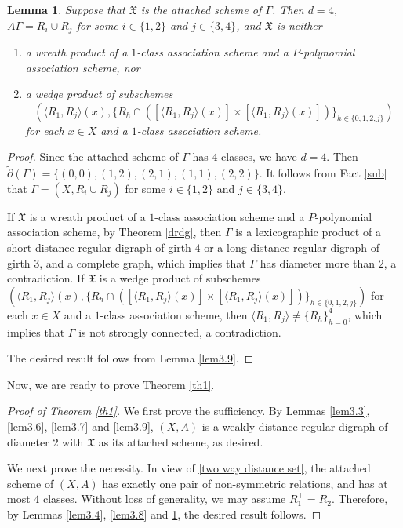 \documentclass[12pt,a4paper]{amsart}
\newtheorem{lemma}[thm]{Lemma}
\theoremstyle{definition}
\begin{document}
\begin{lemma}\label{lem3.10}
Suppose that $\mathfrak{X}$ is the attached scheme of $\Gamma$.	Then $d=4$,  $A\Gamma=R_i\cup R_j$ for some $i\in\{1,2\}$ and $j\in\{3,4\}$, and $\mathfrak{X}$ is neither
\begin{enumerate}
\item\label{lem3.9-1} a wreath product of a $1$-class association scheme and a $P$-polynomial association scheme, nor
	
\item\label{lem3.9-2} a wedge product of subschemes $$(\langle R_1,R_j\rangle(x),\{R_h\cap ([\langle R_1,R_j\rangle(x)]\times [\langle R_1,R_j\rangle(x)])\}_{h\in \{0,1,2,j\}})$$ for each $x\in X$ and a $1$-class association scheme.
\end{enumerate}
\end{lemma}

\begin{proof}
Since the attached scheme of $\Gamma$ has $4$ classes, we have $d=4$. Then $\tilde{\partial}(\Gamma)= \{(0,0),(1,2),(2,1),(1,1),(2,2)\}$. It follows from Fact \ref{sub} that $\Gamma=(X,R_i\cup R_{j})$ for some $i\in\{1,2\}$ and $j\in\{3,4\}$.

If $\mathfrak{X}$ is a wreath product of a $1$-class association scheme and a $P$-polynomial association scheme, by Theorem \ref{drdg}, then $\Gamma$ is a lexicographic product of a short distance-regular digraph of girth $4$ or a long distance-regular digraph of girth $3$, and a complete graph, which implies that $\Gamma$ has diameter more than $2$, a contradiction. If $\mathfrak{X}$ is a wedge product of subschemes $(\langle R_1,R_j\rangle(x),\{R_h\cap ([\langle R_1,R_j\rangle(x)]\times [\langle R_1,R_j\rangle(x)])\}_{h\in \{0,1,2,j\}})$ for each $x\in X$ and a $1$-class association scheme, then $\langle R_1,R_j \rangle \neq \{R_h\}_{h=0}^4$, which implies that $\Gamma$ is not strongly connected, a contradiction.

The desired result follows from Lemma \ref{lem3.9}.
\end{proof}

Now, we are ready to prove Theorem \ref{th1}.

\begin{proof}[Proof of Theorem \ref{th1}]
We first prove the sufficiency. By Lemmas \ref{lem3.3}, \ref{lem3.6}, \ref{lem3.7} and \ref{lem3.9}, $(X,A)$ is a weakly distance-regular digraph of diameter $2$ with $\mathfrak{X}$ as its attached scheme, as desired.

We next prove the necessity. In view of \eqref{two way distance set}, the attached scheme of $(X,A)$ has exactly one pair of non-symmetric relations, and has at most $4$ classes. Without loss of generality, we may assume $R_1^{\top}=R_2$. Therefore, by Lemmas \ref{lem3.4}, \ref{lem3.8} and \ref{lem3.10}, the desired result follows.
\end{proof}
\end{document}
